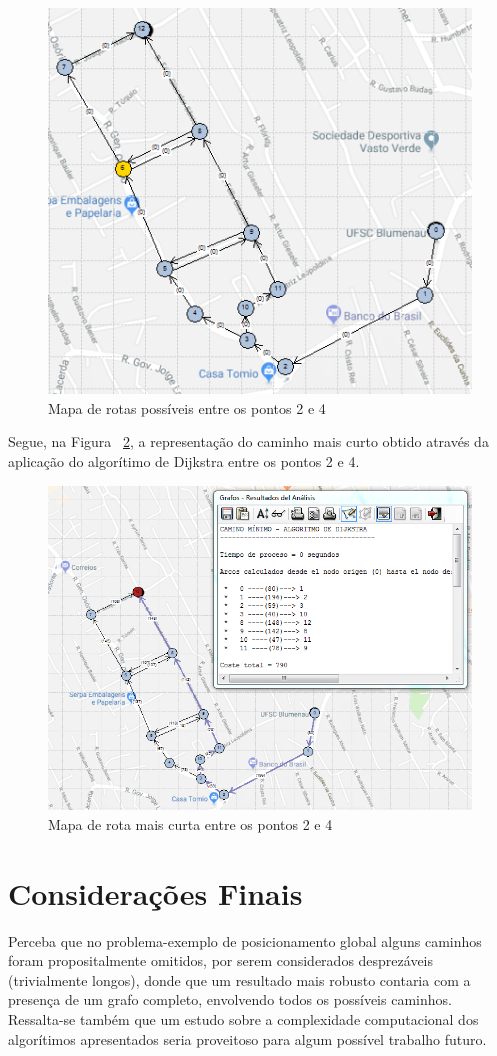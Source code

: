 \documentclass[a4paper,12pt]{article}
\begin{document}
\begin{figure}[H]
	\begin{center}
		\includegraphics[width=0.6\linewidth]{cam3.png}
	\end{center}
	\caption{Mapa de rotas possíveis entre os pontos 2 e 4}
	\label{fig:mapa3}
\end{figure}

Segue, na Figura ~\ref{fig:mapa3sol}, a representação do caminho mais curto obtido através da aplicação do algorítimo de Dijkstra entre os pontos 2 e 4.

\begin{figure}[H]
	\begin{center}
		\includegraphics[width=0.8\linewidth]{cam3sol.png}
	\end{center}
	\caption{Mapa de rota mais curta entre os pontos 2 e 4}
	\label{fig:mapa3sol}
\end{figure}

\section{Considerações Finais}
Perceba que no problema-exemplo de posicionamento global alguns caminhos foram propositalmente omitidos, por serem considerados desprezáveis (trivialmente longos), donde que um resultado mais robusto contaria com a presença de um grafo completo, envolvendo todos os possíveis caminhos. Ressalta-se também que um estudo sobre a complexidade computacional dos algorítimos apresentados seria proveitoso para algum possível trabalho futuro.
\end{document}

